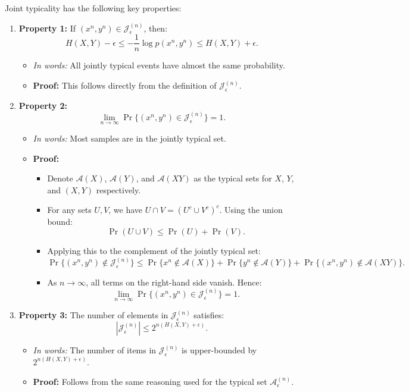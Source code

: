 Joint typicality has the following key properties:
\begin{enumerate}
    \item \textbf{Property 1:} If $(x^n, y^n) \in \mathcal{J}_\epsilon^{(n)}$, then:
    \[
    H(X, Y) - \epsilon \leq -\frac{1}{n} \log p(x^n, y^n) \leq H(X, Y) + \epsilon.
    \]
    \begin{itemize}
        \item \textit{In words:} All jointly typical events have almost the same probability.
        \item \textbf{Proof:} This follows directly from the definition of $\mathcal{J}_\epsilon^{(n)}$.
    \end{itemize}

    \item \textbf{Property 2:}
    \[
    \lim_{n \to \infty} \Pr\{ (x^n, y^n) \in \mathcal{J}_\epsilon^{(n)} \} = 1.
    \]
    \begin{itemize}
        \item \textit{In words:} Most samples are in the jointly typical set.
        \item \textbf{Proof:}
        \begin{itemize}
            \item Denote $\mathcal{A}(X)$, $\mathcal{A}(Y)$, and $\mathcal{A}(XY)$ as the typical sets for $X$, $Y$, and $(X, Y)$ respectively.
            \item For any sets $U, V$, we have $U \cap V = (U^c \cup V^c)^c$. Using the union bound:
            \[
            \Pr(U \cup V) \leq \Pr(U) + \Pr(V).
            \]
            \item Applying this to the complement of the jointly typical set:
            \[
            \Pr\{(x^n, y^n) \notin \mathcal{J}_\epsilon^{(n)} \} \leq \Pr\{x^n \notin \mathcal{A}(X)\} + \Pr\{y^n \notin \mathcal{A}(Y)\} + \Pr\{(x^n, y^n) \notin \mathcal{A}(XY)\}.
            \]
            \item As $n \to \infty$, all terms on the right-hand side vanish. Hence:
            \[
            \lim_{n \to \infty} \Pr\{(x^n, y^n) \in \mathcal{J}_\epsilon^{(n)}\} = 1.
            \]
        \end{itemize}
    \end{itemize}

    \item \textbf{Property 3:} The number of elements in $\mathcal{J}_\epsilon^{(n)}$ satisfies:
    \[
    |\mathcal{J}_\epsilon^{(n)}| \leq 2^{n(H(X, Y) + \epsilon)}.
    \]
    \begin{itemize}
        \item \textit{In words:} The number of items in $\mathcal{J}_\epsilon^{(n)}$ is upper-bounded by $2^{n(H(X, Y) + \epsilon)}$.
        \item \textbf{Proof:} Follows from the same reasoning used for the typical set $\mathcal{A}_\epsilon^{(n)}$.
    \end{itemize}


\end{enumerate}
